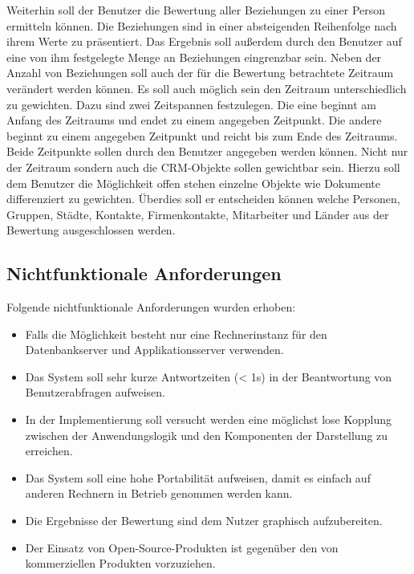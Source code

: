 Weiterhin soll der Benutzer die Bewertung aller Beziehungen zu einer Person ermitteln können. Die Beziehungen sind in einer absteigenden Reihenfolge nach ihrem Werte zu präsentiert. Das Ergebnis soll außerdem durch den Benutzer auf eine von ihm festgelegte Menge an Beziehungen eingrenzbar sein. Neben der Anzahl von Beziehungen soll auch der für die Bewertung betrachtete Zeitraum verändert werden können. Es soll auch möglich sein den Zeitraum unterschiedlich zu gewichten. Dazu sind zwei Zeitspannen festzulegen. Die eine beginnt am Anfang des Zeitraums und endet zu einem angegeben Zeitpunkt. Die andere beginnt zu einem angegeben Zeitpunkt und reicht bis zum Ende des Zeitraums. Beide Zeitpunkte sollen durch den Benutzer angegeben werden können. Nicht nur der Zeitraum sondern auch die CRM-Objekte sollen gewichtbar sein. Hierzu soll dem Benutzer die Möglichkeit offen stehen einzelne Objekte wie Dokumente differenziert zu gewichten. Überdies soll er entscheiden können welche Personen, Gruppen, Städte, Kontakte, Firmenkontakte, Mitarbeiter und Länder aus der Bewertung ausgeschlossen werden.

\subsection{Nichtfunktionale Anforderungen}

Folgende nichtfunktionale Anforderungen wurden erhoben:

\begin{itemize}
	
	\item Falls die Möglichkeit besteht nur eine Rechnerinstanz für den Datenbankserver und Applikationsserver verwenden.
	
	\item Das System soll sehr kurze Antwortzeiten (< 1s) in der Beantwortung von Benutzerabfragen aufweisen. 
	
	\item In der Implementierung soll versucht werden eine möglichst lose Kopplung zwischen der Anwendungslogik und den Komponenten der Darstellung zu erreichen.
	
	\item Das System soll eine hohe Portabilität aufweisen, damit es einfach auf anderen Rechnern in Betrieb genommen werden kann.
	
	\item Die Ergebnisse der Bewertung sind dem Nutzer graphisch aufzubereiten. 
	
	\item Der Einsatz von Open-Source-Produkten ist gegenüber den von kommerziellen Produkten vorzuziehen.

\end{itemize}


